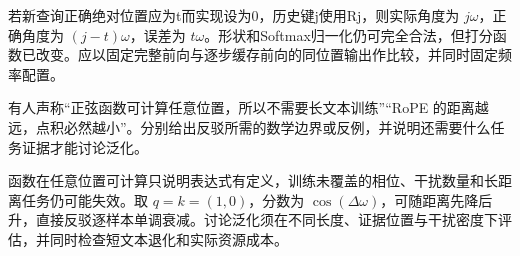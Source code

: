 \begin{exercises}
\begin{exercise}
\begin{solution}
若新查询正确绝对位置应为t而实现设为0，历史键j使用Rj，则实际角度为 $j\omega$，正确角度为 $(j-t)\omega$，误差为 $t\omega$。形状和Softmax归一化仍可完全合法，但打分函数已改变。应以固定完整前向与逐步缓存前向的同位置输出作比较，并同时固定频率配置。
\end{solution}
\end{exercise}

\begin{exercise} 有人声称“正弦函数可计算任意位置，所以不需要长文本训练”“RoPE 的距离越远，点积必然越小”。分别给出反驳所需的数学边界或反例，并说明还需要什么任务证据才能讨论泛化。

\begin{solution}
函数在任意位置可计算只说明表达式有定义，训练未覆盖的相位、干扰数量和长距离任务仍可能失效。取 $q=k=(1,0)$，分数为 $\cos(\Delta\omega)$，可随距离先降后升，直接反驳逐样本单调衰减。讨论泛化须在不同长度、证据位置与干扰密度下评估，并同时检查短文本退化和实际资源成本。
\end{solution}
\end{exercise}

\end{exercises}
